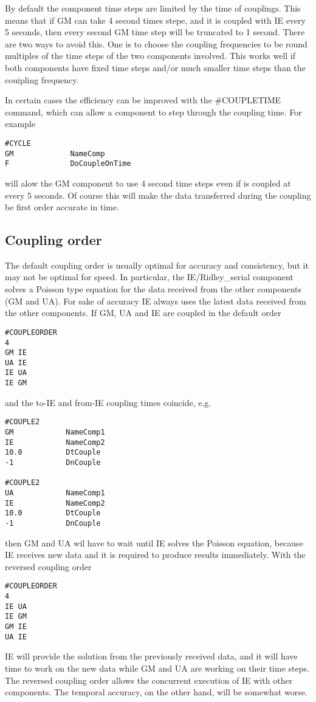 By default the component time steps are limited by the
time of couplings. This means that if GM can take 4 second
times stepe, and it is coupled with IE every 5 seconds,
then every second GM time step will be truncated to 1 second.
There are two ways to avoid this. One is to choose the
coupling frequencies to be round multiples of the time steps
of the two components involved. This works well if both components
have fixed time steps and/or much smaller time steps than the 
couipling frequency.

In certain cases the efficiency can be improved with the
\#COUPLETIME command, which can allow a component to 
step through the coupling time. For example
\begin{verbatim}
#CYCLE
GM             NameComp
F              DoCoupleOnTime
\end{verbatim}
will alow the GM component to use 4 second time steps even
if is coupled at every 5 seconds. Of course this will
make the data transferred during the coupling be 
first order accurate in time.

\subsection{Coupling order}

The default coupling order is usually optimal for accuracy
and consistency, but it may not be optimal for speed.
In particular, the IE/Ridley\_serial component solves
a Poisson type equation for the data received from the 
other components (GM and UA). For sake of accuracy
IE always uses the latest data received from the other
components. If GM, UA and IE are coupled
in the default order
\begin{verbatim}
#COUPLEORDER
4
GM IE
UA IE
IE UA
IE GM
\end{verbatim}
and the to-IE and from-IE coupling times coincide, e.g.
\begin{verbatim}
#COUPLE2
GM            NameComp1
IE            NameComp2
10.0          DtCouple
-1            DnCouple

#COUPLE2
UA            NameComp1
IE            NameComp2
10.0          DtCouple
-1            DnCouple
\end{verbatim}
then GM and UA wil have to wait until IE solves
the Poisson equation, because IE receives new data
and it is required to produce results immediately.
With the reversed coupling order
\begin{verbatim}
#COUPLEORDER
4
IE UA
IE GM
GM IE
UA IE
\end{verbatim}
IE will provide the solution from the previously received data,
and it will have time to work on the new data while GM and UA
are working on their time steps. The reversed coupling order
allows the concurrent execution of IE with other components.
The temporal accuracy, on the other hand, will be somewhat worse.

